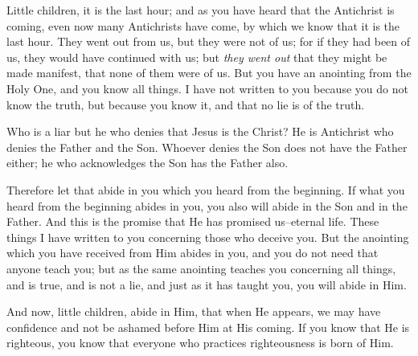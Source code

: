 \bverse Little children, it is the last hour; and as you have heard that the Antichrist is coming, even now many Antichrists have come, by which we know that it is the last hour.
\bverse They went out from us, but they were not of us; for if they had been of us, they would have continued with us; but \textit{they went out} that they might be made manifest, that none of them were of us.
\bverse But you have an anointing from the Holy One, and you know all things. 
\bverse I have not written to you because you do not know the truth, but because you know it, and that no lie is of the truth.

\bverse Who is a liar but he who denies that Jesus is the Christ? He is Antichrist who denies the Father and the Son.
\bverse Whoever denies the Son does not have the Father either; he who acknowledges the Son has the Father also.


\bverse Therefore let that abide in you which you heard from the beginning. If what you heard from the beginning abides in you, you also will abide in the Son and in the Father.
\bverse And this is the promise that He has promised us--eternal life.
\bverse These things I have written to you concerning those who  deceive you.
\bverse But the anointing which you have received from Him abides in you, and you do not need that anyone teach you; but as the same anointing teaches you concerning all things, and is true, and is not a lie, and just as it has taught you, you will abide in Him.


\bverse And now, little children, abide in Him, that when He appears, we may have confidence and not be ashamed before Him at His coming.
\bverse If you know that He is righteous, you know that everyone who practices righteousness is born of Him.
